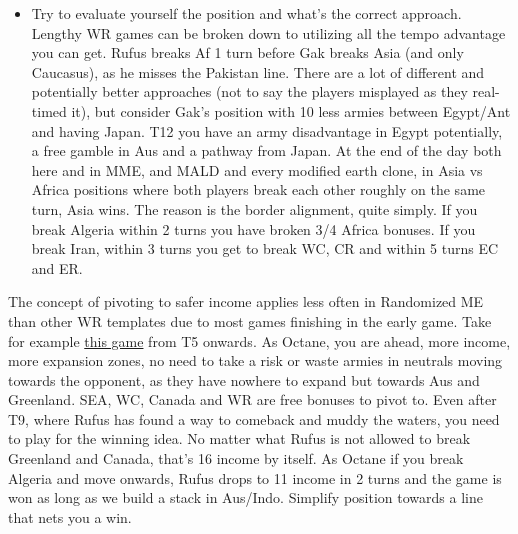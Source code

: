 \begin{itemize}
    \item Try to evaluate yourself the position and what's the correct approach. Lengthy WR games can be broken down to utilizing all the tempo advantage you can get. Rufus breaks Af 1 turn before Gak breaks Asia (and only Caucasus), as he misses the Pakistan line. There are a lot of different and potentially better approaches (not to say the players misplayed as they real-timed it), but consider Gak's position with 10 less armies between Egypt/Ant and having Japan. T12 you have an army disadvantage in Egypt potentially, a free gamble in Aus and a pathway from Japan. At the end of the day both here and in MME, and MALD and every modified earth clone, in Asia vs Africa positions where both players break each other roughly on the same turn, Asia wins. The reason is the border alignment, quite simply. If you break Algeria within 2 turns you have broken 3/4 Africa bonuses. If you break Iran, within 3 turns you get to break WC, CR and within 5 turns EC and ER. 
\end{itemize}

The concept of pivoting to safer income applies less often in Randomized ME than other WR templates due to most games finishing in the early game. Take for example \href{https://www.warzone.com/MultiPlayer?GameID=38698474}{this game} from T5 onwards. As Octane, you are ahead, more income, more expansion zones, no need to take a risk or waste armies in neutrals moving towards the opponent, as they have nowhere to expand but towards Aus and Greenland. SEA, WC, Canada and WR are free bonuses to pivot to. Even after T9, where Rufus has found a way to comeback and muddy the waters, you need to play for the winning idea. No matter what Rufus is not allowed to break Greenland and Canada, that's 16 income by itself. As Octane if you break Algeria and move onwards, Rufus drops to 11 income in 2 turns and the game is won as long as we build a stack in Aus/Indo. Simplify position towards a line that nets you a win.